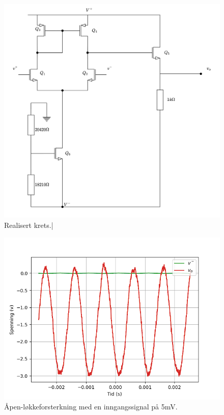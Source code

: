 \begin{figure}[H]
    \centering
    \includegraphics[scale=0.1]{./Images/03Research/full kretes.drawio.png}
    \caption{Realisert krets.\cite{pham_2022_selvlaget}|}
    \label{fig:realisert}
\end{figure}

\begin{figure}[H]
    \centering
    \includegraphics[scale=0.5]{./Images/03Research/åpenløkkeplain.png}
    \caption{Åpen-løkkeforsterkning med en inngangssignal på 5mV.}
    \label{fig:åpenløkke}
\end{figure}

